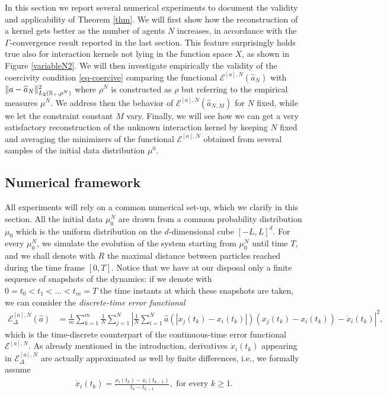 In this section we report several numerical experiments to document the validity and applicability of Theorem \ref{thm}. We will first show how the reconstruction of a kernel gets better as the number of agents $N$ increases, in accordance with the $\Gamma$-convergence result reported in the last section. This feature surprisingly holds true also for interaction kernels not lying in the function space $X$, as shown in Figure \ref{variableN2}. We will then investigate empirically the validity of the coercivity condition \eqref{eq-coercive} comparing the functional $\mathcal E^{[a],N}(\widehat a_N)$ with $\|a - \widehat a_N\|_{L_2(\mathbb{R}_+,\rho^N)}^2$ where $\rho^N$ is constructed as $\rho$ but referring to the empirical measures $\mu^N$. We address then the behavior of $\mathcal E^{[a],N}(\widehat a_{N,M})$ for $N$ fixed, while we let the constraint constant  $M$ vary. Finally, we will see how we can get a very satisfactory reconstruction of the unknown interaction kernel by keeping $N$ fixed and averaging the minimizers of the functional $\mathcal E^{[a],N}$ obtained from several samples of the initial data distribution $\mu^0$.

\subsection{Numerical framework}\label{numfram}

All experiments will rely on a common numerical set-up, which we clarify in this section. All the initial data $\mu^N_0$ are drawn from a common probability distribution $\mu_0$ which is the uniform distribution on the $d$-dimensional cube $[-L,L]^d$. For every $\mu^N_0$, we simulate the evolution of the system starting from $\mu^N_0$ until time $T$, and we shall denote with $R$ the maximal distance between particles reached during the time frame $[0,T]$. Notice that we have at our disposal only a finite sequence of snapshots of the dynamics: if we denote with $0 = t_0 < t_1 < \ldots < t_m = T$ the time instants at which these snapshots are taken, we can consider the \textit{discrete-time error functional}
\begin{align*}
\mathcal{E}^{[a],N}_\Delta(\widehat{a}) & = \frac{1}{m} \sum^m_{k = 1} \frac{1}{N} \sum^N_{j = 1} \left| \frac{1}{N} \sum^N_{i = 1} \widehat{a}(|x_j(t_k) - x_i(t_k)|)(x_j(t_k) - x_i(t_k)) - \dot{x}_i(t_k)\right|^2,
\end{align*}
which is the time-discrete counterpart of the continuous-time error functional $\mathcal{E}^{[a],N}$. As already mentioned in the introduction, derivatives $\dot{x}_i(t_k)$ appearing in $\mathcal{E}^{[a],N}_\Delta$ are actually approximated as well by finite differences, i.e., we formally assume
\begin{align*}
\dot{x}_i(t_k) = \frac{x_i(t_k) - x_i(t_{k-1})}{t_k - t_{k-1}}, \text{ for every } k \geq 1.
\end{align*}

